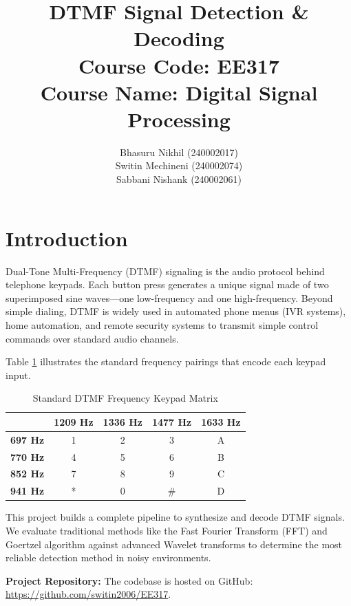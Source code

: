 \documentclass[12pt, a4paper]{article}
\title{
    \textbf{DTMF Signal Detection \& Decoding} \\[0.5em]
    \large \textbf{Course Code:} EE317 \\
    \large \textbf{Course Name:} Digital Signal Processing
}
\author{
    Bhasuru Nikhil (240002017) \\
    Switin Mechineni (240002074) \\
    Sabbani Nishank (240002061)
}
\begin{document}
\maketitle

\section{Introduction}
Dual-Tone Multi-Frequency (DTMF) signaling is the audio protocol behind telephone keypads. Each button press generates a unique signal made of two superimposed sine waves—one low-frequency and one high-frequency. Beyond simple dialing, DTMF is widely used in automated phone menus (IVR systems), home automation, and remote security systems to transmit simple control commands over standard audio channels.

Table \ref{tab:dtmf} illustrates the standard frequency pairings that encode each keypad input.

\begin{table}[h!]
    \centering
    \begin{tabular}{|c|c|c|c|c|}
        \hline
        & \textbf{1209 Hz} & \textbf{1336 Hz} & \textbf{1477 Hz} & \textbf{1633 Hz} \\ \hline
        \textbf{697 Hz} & 1 & 2 & 3 & A \\ \hline
        \textbf{770 Hz} & 4 & 5 & 6 & B \\ \hline
        \textbf{852 Hz} & 7 & 8 & 9 & C \\ \hline
        \textbf{941 Hz} & * & 0 & \# & D \\ \hline
    \end{tabular}
    \caption{Standard DTMF Frequency Keypad Matrix}
    \label{tab:dtmf}
\end{table}

This project builds a complete pipeline to synthesize and decode DTMF signals. We evaluate traditional methods like the Fast Fourier Transform (FFT) and Goertzel algorithm against advanced Wavelet transforms to determine the most reliable detection method in noisy environments.

\textbf{Project Repository:} The codebase is hosted on GitHub: \url{https://github.com/switin2006/EE317}.

\end{document}
